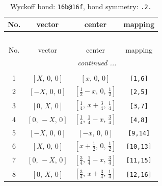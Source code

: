 \documentclass[fleqn,8pt]{jsarticle}
\begin{document}
\begin{longtable}{cccc}
\caption{Wyckoff bond: {\tt 16b@16f}, bond symmetry: {\tt .2.}}
 \\
 \hline \hline
No. & vector & center & mapping \\ \hline \endfirsthead

\multicolumn{3}{l}{\tablename\ \thetable{}} \\
 \hline \hline
No. & vector & center & mapping \\ \hline \endhead

 \hline \hline
\multicolumn{3}{r}{\footnotesize\it continued ...} \\ \endfoot

 \hline \hline
\multicolumn{3}{r}{} \\ \endlastfoot

1 & $\left[ X,\, 0,\, 0 \right]$ & $\left[ x,\, 0,\, 0 \right]$ & {\tt [1,6]} \\ \hline
2 & $\left[ - X,\, 0,\, 0 \right]$ & $\left[ \frac{1}{2} - x,\, 0,\, \frac{1}{2} \right]$ & {\tt [2,5]} \\ \hline
3 & $\left[ 0,\, X,\, 0 \right]$ & $\left[ \frac{1}{4},\, x + \frac{3}{4},\, \frac{1}{4} \right]$ & {\tt [3,7]} \\ \hline
4 & $\left[ 0,\, - X,\, 0 \right]$ & $\left[ \frac{1}{4},\, \frac{1}{4} - x,\, \frac{3}{4} \right]$ & {\tt [4,8]} \\ \hline
5 & $\left[ - X,\, 0,\, 0 \right]$ & $\left[ - x,\, 0,\, 0 \right]$ & {\tt [9,14]} \\ \hline
6 & $\left[ X,\, 0,\, 0 \right]$ & $\left[ x + \frac{1}{2},\, 0,\, \frac{1}{2} \right]$ & {\tt [10,13]} \\ \hline
7 & $\left[ 0,\, - X,\, 0 \right]$ & $\left[ \frac{3}{4},\, \frac{1}{4} - x,\, \frac{3}{4} \right]$ & {\tt [11,15]} \\ \hline
8 & $\left[ 0,\, X,\, 0 \right]$ & $\left[ \frac{3}{4},\, x + \frac{3}{4},\, \frac{1}{4} \right]$ & {\tt [12,16]} \\
\end{longtable}
\renewcommand{\arraystretch}{1.2}
\end{document}
